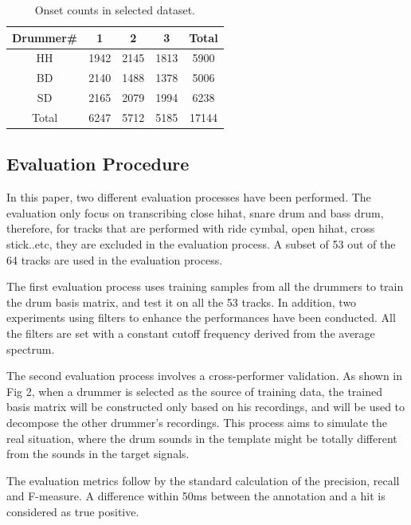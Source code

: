 \documentclass{article}
\begin{document}
\begin{table}[h]
\begin{center}
\begin{tabular}{|c|c|c|c|c|}
\hline
Drummer\# & 1    & 2    & 3    & Total \\ \hline
HH        & 1942 & 2145 & 1813 & 5900  \\ \hline
BD        & 2140 & 1488 & 1378 & 5006  \\ \hline
SD        & 2165 & 2079 & 1994 & 6238  \\ \hline
Total     & 6247 & 5712 & 5185 & 17144 \\ \hline
\end{tabular}
 \caption{Onset counts in selected dataset.}
 \label{tab:onsetCount}
\end{center}
\end{table}

\subsection{Evaluation Procedure}\label{subsec:evaluation procedure}

In this paper, two different evaluation processes have been performed. The evaluation only focus on transcribing close hihat, snare drum and bass drum, therefore, for tracks that are performed with ride cymbal, open hihat, cross stick..etc, they are excluded in the evaluation process. A subset of 53 out of the 64 tracks are used in the evaluation process. 

The first evaluation process uses training samples from all the drummers to train the drum basis matrix, and test it on all the 53 tracks. In addition, two experiments using filters to enhance the performances have been conducted. All the filters are set with a constant cutoff frequency derived from the average spectrum. 

The second evaluation process involves a cross-performer validation. As shown in Fig 2, when a drummer is selected as the source of training data, the trained basis matrix will be constructed only based on his recordings, and will be used to decompose the other drummer’s recordings. This process aims to simulate the real situation, where the drum sounds in the template might be totally different from the sounds in the target signals.

The evaluation metrics follow by the standard calculation of the precision, recall and F-measure. A difference within 50ms between the annotation and a hit is considered as true positive.   
\end{document}
